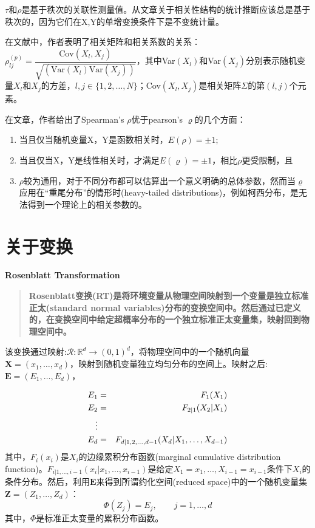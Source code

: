 \textcolor[rgb]{1,0,0}{$\tau$和$\rho$是基于秩次的关联性测量值。从文章\cite{Genest2007}关于相关性结构的统计推断应该总是基于秩次的，因为它们在X,Y的单增变换条件下是不变统计量。}


在文献\cite{Deligiannis2012}中，作者表明了相关矩阵和相关系数的关系：$\rho_{lj}^{(p)} = \dfrac{\text{Cov}(X_l,X_j)}{\sqrt{\left(\text{Var}(X_l)\text{Var}(X_j)\right)}}$，其中Var$(X_l)$和Var$(X_j)$分别表示随机变量$X_l$和$X_j$的方差，$l,j \in \{1,2,\dots,N\}$；Cov$(X_l,X_j)$是相关矩阵$\Sigma$的第$(l,j)$个元素。

在文章\cite{Genest2007}，作者给出了Spearman's $\rho$优于pearson's $\varrho$的几个方面：
\begin{enumerate}[1.]
    \item 当且仅当随机变量X，Y是函数相关时，$E(\rho) = \pm 1$;
    \item 当且仅当X，Y是线性相关时，才满足$E(\varrho) = \pm 1$，相比$\rho$更受限制，且
    \item $\rho$较为通用，对于不同分布都可以估算出一个意义明确的总体参数，然而当$\varrho$应用在``重尾分布''的情形时(heavy-tailed distributions)，例如柯西分布，是无法得到一个理论上的相关参数的。
\end{enumerate}







\section{关于变换}
\textbf{\textcolor[rgb]{1,0,0}{Rosenblatt Transformation}}
\begin{quotation}
    \textbf{\textcolor[rgb]{1,0,0}{Rosenblatt变换(RT)是将环境变量从物理空间映射到一个变量是独立标准正太(standard normal variables)分布的变换空间中。然后通过已定义的，在变换空间中给定超概率分布的一个独立标准正太变量集，映射回到物理空间中。}}\cite{Montes2015}
\end{quotation}


该变换通过映射:$\mathcal{R}: \mathbb{R}^d \rightarrow (0,1)^d$，将物理空间中的一个随机向量$\mathbf{X}=(x_1,\dots,x_d)$，映射到随机变量独立均匀分布的空间上。映射之后:$\mathbf{E} = (E_1,\dots,E_d)$\cite{Montes2015}，

\begin{eqnarray}
    E_1 &=& F_1(X_1)  \notag \\
    E_2 &=& F_{2|1}(X_2|X_1) \notag \\
    \vdots \\
    E_d &=& F_{d|1,2,\dots,d-1} (X_d | X_1,\dots,X_{d-1}) \notag
    \label{eq-rosenblatt}
\end{eqnarray}
其中，$F_i(x_i)$是$X_i$的\textcolor[rgb]{1,0,0}{边缘累积分布函数(marginal cumulative distribution function)}。$F_{i|1,\dots,i-1}(x_i|x_1,\dots,x_{i-1})$是给定$X_1 = x_1,\dots,X_{i-1}=x_{i-1}$条件下$X_i$的条件分布。然后，利用$\mathbf{E}$来得到所谓\textcolor[rgb]{1,0,0}{约化空间(reduced space)}中的一个随机变量集$\mathbf{Z} = (Z_1,\dots,Z_d)$：
\begin{equation}
    \Phi (Z_j) = E_j, \qquad j=1,\dots,d
    \label{eq-cdf}
\end{equation}
其中，$\Phi$是标准正太变量的累积分布函数。


